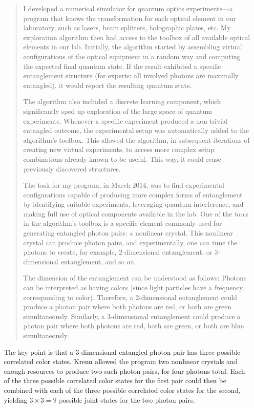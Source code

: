 \begin{quote}

I developed a numerical simulator for quantum optics experiments---a program that knows the transformation for each optical element in our laboratory, such as lasers, beam splitters, holographic plates, etc.
My exploration algorithm then had access to the toolbox of all available optical elements in our lab. 
Initially, the algorithm started by assembling virtual configurations of the optical equipment in a random way and computing the expected final quantum state.
If the result exhibited a specific entanglement structure (for experts: all involved photons are maximally entangled), it would report the resulting quantum state. 

The algorithm also included a discrete learning component, which significantly sped up exploration of the large space of quantum experiments.
Whenever a specific experiment produced a non-trivial entangled outcome, 
the experimental setup was automatically added to the algorithm's toolbox.
This allowed the algorithm, in subsequent iterations of creating new virtual experiments, to access more complex setup combinations already known to be useful.
This way, it could reuse previously discovered structures. 

The task for my program, in March 2014, was to find experimental configurations capable of producing more complex forms of entanglement by identifying suitable experiments, leveraging quantum interference, and making full use of optical components available in the lab.
One of the tools in the algorithm's toolbox is a specific element commonly used for generating entangled photon pairs: a nonlinear crystal. 
This nonlinear crystal can produce photon pairs, and experimentally, one can tune the photons to create, for example, 2-dimensional entanglement, or 3-dimensional entanglement, and so on.

The dimension of the entanglement can be understood as follows: 
Photons can be interpreted as having colors (since light particles have a frequency corresponding to color).
Therefore, a 2-dimensional entanglement could produce a photon pair where both photons are red, or both are green simultaneously. Similarly, a
3-dimensional entanglement could produce a photon pair where both photons are red, both are green, or both are blue simultaneously.

\end{quote}

The key point is that a 3-dimensional entangled photon pair has three possible correlated color states.
Krenn allowed the program two nonlinear crystals and enough resources to produce two such photon pairs, for four photons total. 
Each of the three possible correlated color states for the first pair could then be combined with each of the three possible correlated color states for the second, yielding $3 \times 3=9$ possible joint states for the two photon pairs. 

